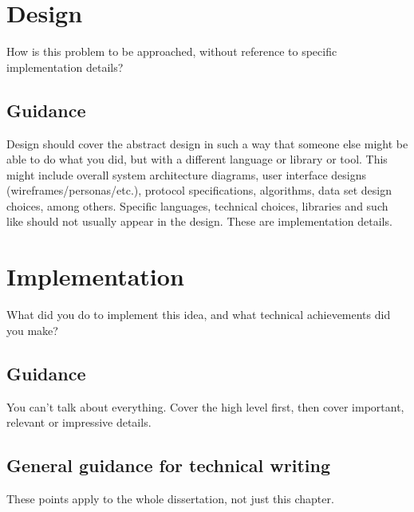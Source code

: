 \documentclass{l4proj}
\begin{document}


\chapter{Design}
How is this problem to be approached, without reference to specific implementation details? 
\section{Guidance}
Design should cover the abstract design in such a way that someone else might be able to do what you did, 
but with a different language or library or tool. This might include overall system architecture diagrams,
user interface designs (wireframes/personas/etc.), protocol specifications, algorithms, data set design choices,
among others. Specific languages, technical choices, libraries and such like should not usually appear in the design. These are implementation details.


\chapter{Implementation}
What did you do to implement this idea, and what technical achievements did you make?
\section{Guidance}
You can't talk about everything. Cover the high level first, then cover important, relevant or impressive details.

\section{General guidance for technical writing}

These points apply to the whole dissertation, not just this chapter.
\end{document}
